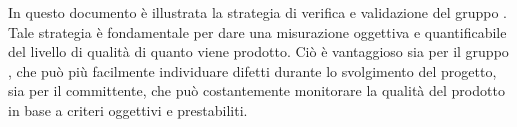 In questo documento è illustrata la {strategia} di {verifica} e {validazione} del gruppo \gruppo . Tale strategia è fondamentale per dare una misurazione oggettiva e quantificabile del livello di {qualità} di quanto viene prodotto. \newline
Ciò è vantaggioso sia per il gruppo \gruppo , che può più facilmente individuare difetti durante lo svolgimento del progetto, sia per il {committente}, che può costantemente monitorare la qualità del prodotto in base a criteri oggettivi e prestabiliti.

